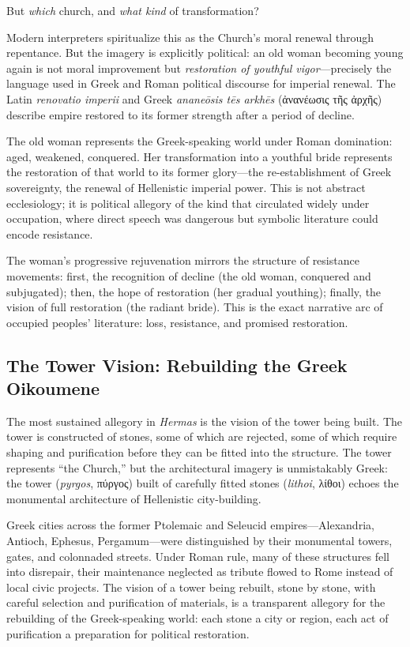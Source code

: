 But \emph{which} church, and \emph{what kind} of transformation?

Modern interpreters spiritualize this as the Church's moral renewal through repentance.
But the imagery is explicitly political: an old woman becoming young again is not moral improvement but \emph{restoration of youthful vigor}---precisely the language used in Greek and Roman political discourse for imperial renewal.
The Latin \emph{renovatio imperii} and Greek \emph{ananeōsis tēs arkhēs} (ἀνανέωσις τῆς ἀρχῆς) describe empire restored to its former strength after a period of decline.

The old woman represents the Greek-speaking world under Roman domination: aged, weakened, conquered.
Her transformation into a youthful bride represents the restoration of that world to its former glory---the re-establishment of Greek sovereignty, the renewal of Hellenistic imperial power.
This is not abstract ecclesiology; it is political allegory of the kind that circulated widely under occupation, where direct speech was dangerous but symbolic literature could encode resistance.

The woman's progressive rejuvenation mirrors the structure of resistance movements: first, the recognition of decline (the old woman, conquered and subjugated); then, the hope of restoration (her gradual youthing); finally, the vision of full restoration (the radiant bride).
This is the exact narrative arc of occupied peoples' literature: loss, resistance, and promised restoration.

\subsection{The Tower Vision: Rebuilding the Greek Oikoumene}

The most sustained allegory in \emph{Hermas} \cite[Vision 3, Similitude 9]{shepherd:hermas} is the vision of the tower being built.
The tower is constructed of stones, some of which are rejected, some of which require shaping and purification before they can be fitted into the structure.
The tower represents ``the Church,'' but the architectural imagery is unmistakably Greek: the tower (\emph{pyrgos}, πύργος) built of carefully fitted stones (\emph{lithoi}, λίθοι) echoes the monumental architecture of Hellenistic city-building.

Greek cities across the former Ptolemaic and Seleucid empires---Alexandria, Antioch, Ephesus, Pergamum---were distinguished by their monumental towers, gates, and colonnaded streets.
Under Roman rule, many of these structures fell into disrepair, their maintenance neglected as tribute flowed to Rome instead of local civic projects.
The vision of a tower being rebuilt, stone by stone, with careful selection and purification of materials, is a transparent allegory for the rebuilding of the Greek-speaking world: each stone a city or region, each act of purification a preparation for political restoration.

